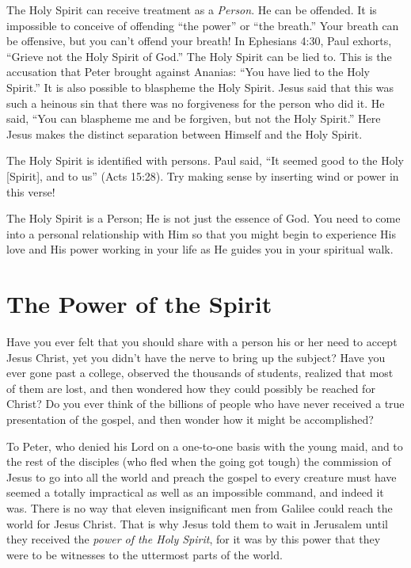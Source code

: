 The Holy Spirit can receive treatment as a \emph{Person}. He
can be offended. It is impossible to conceive of offending
“the power” or “the breath.” Your breath can be offensive,
but you can’t offend your breath! In Ephesians 4:30, Paul
exhorts, “Grieve not the Holy Spirit of God.” The Holy
Spirit can be lied to. This is the accusation that Peter brought
against Ananias: “You have lied to the Holy Spirit.” It is also
possible to blaspheme the Holy Spirit. Jesus said that this
was such a heinous sin that there was no forgiveness for the
person who did it. He said, “You can blaspheme me and be
forgiven, but not the Holy Spirit.” Here Jesus makes the distinct
separation between Himself and the Holy Spirit.

The Holy Spirit is identified with persons. Paul said, “It
seemed good to the Holy [Spirit], and to us” (Acts 15:28).
Try making sense by inserting wind or power in this verse!

The Holy Spirit is a Person; He is not just the essence
of God. You need to come into a personal relationship with
Him so that you might begin to experience His love and His
power working in your life as He guides you in your spiritual
walk.


\section*{The Power of the Spirit}

Have you ever felt that you should share with a person
his or her need to accept Jesus Christ, yet you didn’t have
the nerve to bring up the subject? Have you ever gone past
a college, observed the thousands of students, realized that
most of them are lost, and then wondered how they could
possibly be reached for Christ? Do you ever think of the billions
of people who have never received a true presentation
of the gospel, and then wonder how it might be accomplished?

To Peter, who denied his Lord on a one-to-one basis
with the young maid, and to the rest of the disciples (who
fled when the going got tough) the commission of Jesus to
go into all the world and preach the gospel to every creature
must have seemed a totally impractical as well as an
impossible command, and indeed it was. There is no way
that eleven insignificant men from Galilee could reach the
world for Jesus Christ. That is why Jesus told them to wait
in Jerusalem until they received the \emph{power of the Holy Spirit},
for it was by this power that they were to be witnesses to the
uttermost parts of the world.

